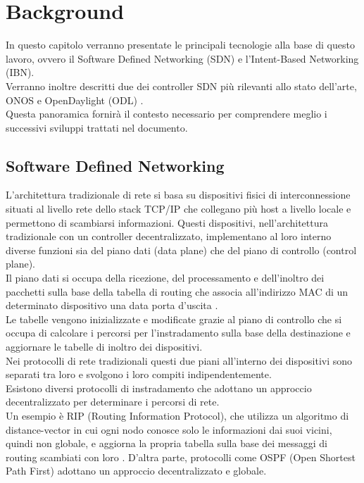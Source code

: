 \chapter{Background}
\label{cap:contesto}
In questo capitolo verranno presentate le principali tecnologie alla base di questo lavoro, ovvero il Software Defined Networking (SDN) e l'Intent-Based Networking (IBN). 
\\Verranno inoltre descritti due dei controller SDN più rilevanti allo stato dell'arte, ONOS \cite{ONOS} e OpenDaylight (ODL) \cite{ODL}. 
\\Questa panoramica fornirà il contesto necessario per comprendere meglio i successivi sviluppi trattati nel documento.
\section{Software Defined Networking}
\label{ch:SDN}
L'architettura tradizionale di rete si basa su dispositivi fisici di interconnessione situati al livello rete dello stack TCP/IP che collegano più host a livello locale e permettono di scambiarsi informazioni.
Questi dispositivi, nell'architettura tradizionale con un controller decentralizzato, implementano al loro interno diverse funzioni sia del piano dati (data plane) che del piano di controllo (control plane). 
\\Il piano dati si occupa della ricezione, del processamento e dell'inoltro dei pacchetti sulla base della tabella di routing che associa all'indirizzo MAC di un determinato dispositivo una data porta d'uscita \cite{tesiSDN:2020}. 
\\Le tabelle vengono inizializzate e modificate grazie al piano di controllo che si occupa di calcolare i percorsi 
per l'instradamento sulla base della destinazione e aggiornare le tabelle di inoltro dei dispositivi. 
\\Nei protocolli di rete tradizionali questi due piani all'interno dei dispositivi sono separati tra loro e svolgono i loro compiti indipendentemente.
\\Esistono diversi protocolli di instradamento che adottano un approccio decentralizzato per determinare i percorsi di rete.
\\Un esempio è RIP (Routing Information Protocol), che utilizza un algoritmo di distance-vector in cui ogni nodo conosce solo le informazioni dai suoi vicini, quindi non globale, e aggiorna la propria tabella sulla base dei messaggi di routing scambiati con loro \cite{rip}.
D'altra parte, protocolli come OSPF (Open Shortest Path First) adottano un approccio decentralizzato e globale.
